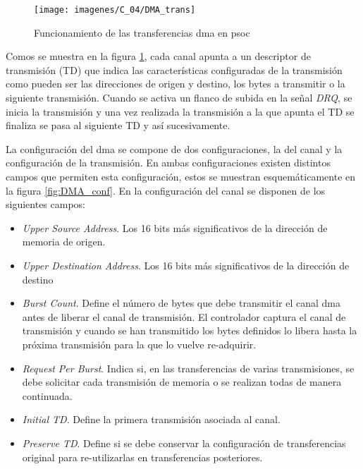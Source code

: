 \begin{figure}[!ht]
	\center
	\texttt{[image: imagenes/C\_04/DMA\_trans]}
	\caption{Funcionamiento de las transferencias \acrshort{dma} en \acrshort{psoc}}
	\label{fig:DMA}
\end{figure}

Comos se muestra en la figura \ref{fig:DMA}, cada canal apunta a un descriptor de transmisión (TD) que indica las características configuradas de la transmisión como pueden ser las direcciones de origen y destino, los bytes a transmitir o la siguiente transmisión. Cuando se activa un flanco de subida en la señal \textit{DRQ}, se inicia la transmisión y una vez realizada la transmisión a la que apunta el TD se finaliza se pasa al siguiente TD y así sucesivamente.

La configuración del \acrshort{dma} se compone de dos configuraciones, la del canal y la configuración de la transmisión. En ambas configuraciones existen distintos campos que permiten esta configuración, estos se muestran esquemáticamente en la figura \ref{fig:DMA_conf}. En la configuración del canal se disponen de los siguientes campos:

\begin{itemize}
\item \textit{Upper Source Address}. Los 16 bits más significativos de la dirección de memoria de origen.

\item \textit{Upper Destination Address}. Los 16 bits más significativos de la dirección de destino

\item \textit{Burst Count}. Define el número de bytes que debe transmitir el canal \acrshort{dma} antes de liberar el canal de transmisión. El controlador captura el canal de transmisión y cuando se han transmitido los bytes definidos lo libera hasta la próxima transmisión para la que lo vuelve re-adquirir.

\item \textit{Request Per Burst}. Indica si, en las transferencias de varias transmisiones, se debe solicitar cada transmisión de memoria o se realizan todas de manera continuada.

\item \textit{Initial TD}. Define la primera transmisión asociada al canal.

\item \textit{Preserve TD}. Define si se debe conservar la configuración de transferencias original para re-utilizarlas en transferencias posteriores.

\end{itemize}

